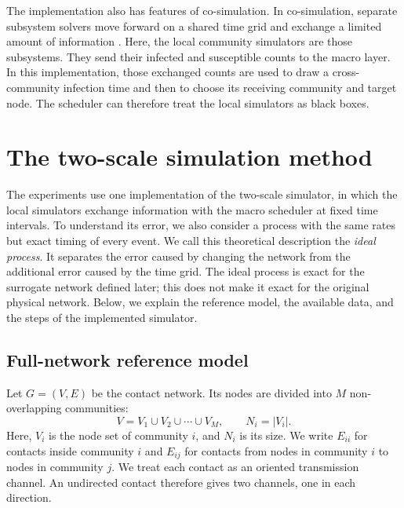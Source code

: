 \documentclass[a4paper,fleqn]{cas-sc}
\begin{document}
The implementation also has features of co-simulation. In co-simulation, separate subsystem solvers move forward on a shared time grid and exchange a limited amount of information \citep{gomes2018cosim}. Here, the local community simulators are those subsystems. They send their infected and susceptible counts to the macro layer. In this implementation, those exchanged counts are used to draw a cross-community infection time and then to choose its receiving community and target node. The scheduler can therefore treat the local simulators as black boxes.

\clearpage

\section{The two-scale simulation method}
\label{sec:method}

The experiments use one implementation of the two-scale simulator, in which the local simulators exchange information with the macro scheduler at fixed time intervals. To understand its error, we also consider a process with the same rates but exact timing of every event. We call this theoretical description the \emph{ideal process}. It separates the error caused by changing the network from the additional error caused by the time grid. The ideal process is exact for the surrogate network defined later; this does not make it exact for the original physical network. Below, we explain the reference model, the available data, and the steps of the implemented simulator.

\subsection{Full-network reference model}
\label{sec:reference}

Let $G=(V,E)$ be the contact network. Its nodes are divided into $M$ non-overlapping communities:
\begin{equation}
\label{eq:partition}
V=V_1\cup V_2\cup\cdots\cup V_M,
\qquad N_i=|V_i|.
\end{equation}
Here, $V_i$ is the node set of community $i$, and $N_i$ is its size. We write $E_{ii}$ for contacts inside community $i$ and $E_{ij}$ for contacts from nodes in community $i$ to nodes in community $j$. We treat each contact as an oriented transmission channel. An undirected contact therefore gives two channels, one in each direction.
\end{document}
